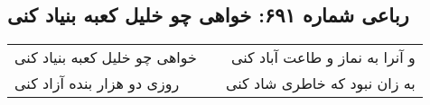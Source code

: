 \begin{center}
\section*{رباعی شماره ۶۹۱: خواهی چو خلیل کعبه بنیاد کنی}
\label{sec:sh691}
\begin{longtable}{l p{0.5cm} r}
خواهی چو خلیل کعبه بنیاد کنی
&&
و آنرا به نماز و طاعت آباد کنی
\\
روزی دو هزار بنده آزاد کنی
&&
به زان نبود که خاطری شاد کنی
\\
\end{longtable}
\end{center}

